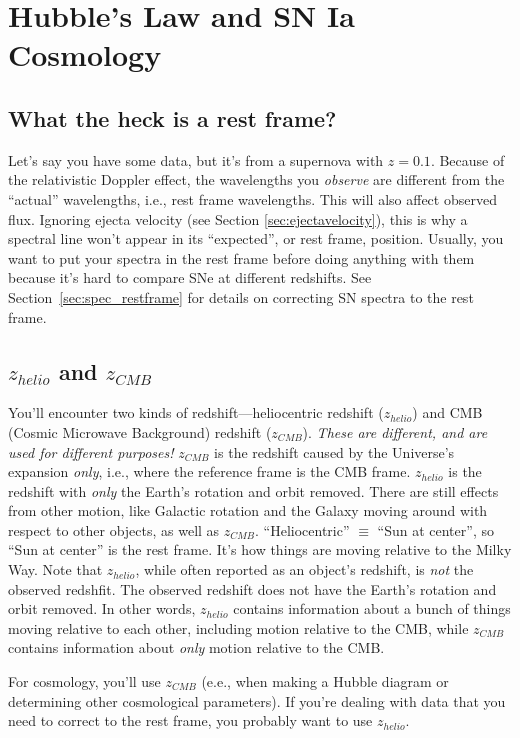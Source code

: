 \section{Hubble's Law and SN Ia Cosmology}

\subsection{What the heck is a rest frame?}

Let's say you have some data, but it's from a supernova with $z = 0.1$. Because of the relativistic Doppler effect, the wavelengths you \textit{observe} are different from the ``actual'' wavelengths, i.e., rest frame wavelengths. This will also affect observed flux. Ignoring ejecta velocity (see Section \ref{sec:ejectavelocity}), this is why a spectral line won't appear in its ``expected'', or rest frame, position. Usually, you want to put your spectra in the rest frame before doing anything with them because it's hard to compare SNe at different redshifts. See Section~\ref{sec:spec_restframe} for details on correcting SN spectra to the rest frame. 

\subsection{$z_{helio}$ and $z_{CMB}$}

You'll encounter two kinds of redshift---heliocentric redshift ($z_{helio}$) and CMB (Cosmic Microwave Background) redshift ($z_{CMB}$). \textit{These are different, and are used for different purposes!} $z_{CMB}$ is the redshift caused by the Universe's expansion \textit{only}, i.e., where the reference frame is the CMB frame. $z_{helio}$ is the redshift with \textit{only} the Earth's rotation and orbit removed. There are still effects from other motion, like Galactic rotation and the Galaxy moving around with respect to other objects, as well as $z_{CMB}$. ``Heliocentric'' $\equiv$ ``Sun at center'', so ``Sun at center'' is the rest frame. It's how things are moving relative to the Milky Way. Note that $z_{helio}$, while often reported as an object's redshift, is \textit{not} the observed redshfit. The observed redshift does not have the Earth's rotation and orbit removed. In other words, $z_{helio}$ contains information about a bunch of things moving relative to each other, including motion relative to the CMB, while $z_{CMB}$ contains information about \textit{only} motion relative to the CMB.

For cosmology, you'll use $z_{CMB}$ (e.e., when making a Hubble diagram or determining other cosmological parameters). If you're dealing with data that you need to correct to the rest frame, you probably want to use $z_{helio}$.

